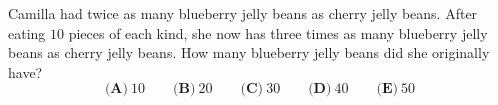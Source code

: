 Camilla had twice as many blueberry jelly beans as cherry jelly beans. After eating $10$ pieces of each kind, she now has three times as many blueberry jelly beans as cherry jelly beans. How many blueberry jelly beans did she originally have?
\[\textbf{(A)}\ 10\qquad\textbf{(B)}\ 20\qquad\textbf{(C)}\ 30\qquad\textbf{(D)}\ 40\qquad\textbf{(E)}\ 50\]
